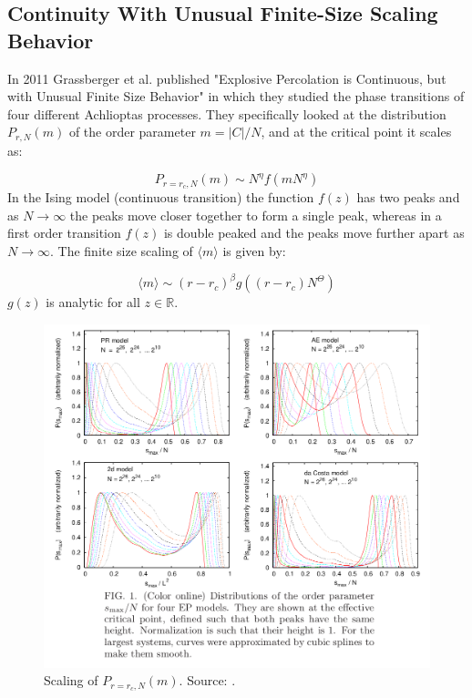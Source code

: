 \subsection{Continuity With Unusual Finite-Size Scaling Behavior}
In 2011 Grassberger et al. published "Explosive Percolation is Continuous, but with Unusual Finite Size Behavior" \cite{Grassberger_1} in which they studied the phase transitions of four different Achlioptas processes.
They specifically looked at the distribution $P_{r, N}(m)$ of the order parameter $m = |C| / N$, and at the critical point it scales as:

\begin{equation}
	P_{r=r_c, N}(m) \sim N^\eta f(m N^\eta)
\end{equation}
In the Ising model (continuous transition) the function $f(z)$ has two peaks and as $N \rightarrow \infty$ the peaks move closer together to form a single peak, whereas in a first order transition $f(z)$ is double peaked and the peaks move further apart as $N \rightarrow \infty$.
The finite size scaling of $\langle m \rangle$ is given by:

\begin{equation}
	\langle m \rangle \sim (r - r_c)^\beta g((r - r_c) N^\Theta)
\end{equation}
$g(z)$ is analytic for all $z \in \mathbb{R}$.

\begin{figure}[H]
	\centering
	\includegraphics[width=350pt]{images/grassberger_scaling.png}
	\caption{Scaling of $P_{r=r_c, N}(m)$. Source: \cite{Grassberger_1}.}
	\label{fig:grassberger_scaling}
\end{figure}

